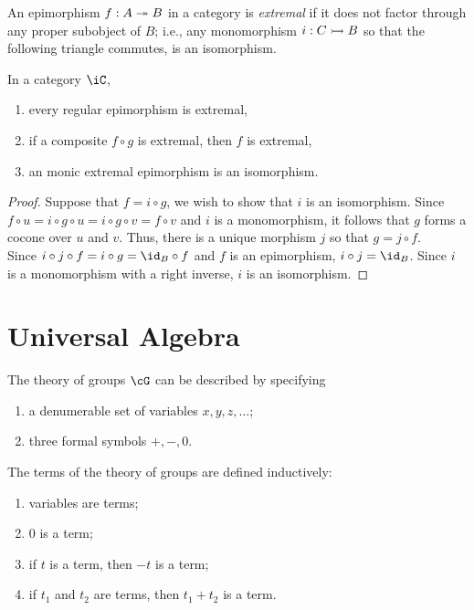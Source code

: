 \documentclass{amsart}
\begin{document}
\begin{defn}
  An epimorphism $f : A \twoheadrightarrow B$ in a category is \emph{extremal} if it does not factor through any proper subobject of $B$; i.e., any monomorphism $i : C \rightarrowtail B$ so that the following triangle commutes, is an isomorphism.
  \[\]
\end{defn}

\begin{prop}
  In a category $\iC$,
  \begin{enumerate}
  \item every regular epimorphism is extremal,
  \item if a composite $f \circ g$ is extremal, then $f$ is extremal,
  \item an monic extremal epimorphism is an isomorphism.
  \end{enumerate}
\end{prop}
\begin{proof}
  Suppose that $f = i \circ g$, we wish to show that $i$ is an isomorphism.
  Since $f \circ u = i \circ g \circ u = i \circ g \circ v = f \circ v$ and $i$ is a monomorphism, it follows that $g$ forms a cocone over $u$ and $v$.
  Thus, there is a unique morphism $j$ so that $g = j \circ f$.
  \[\]
  Since $i \circ j \circ f = i \circ g = \id_{B} \circ f$ and $f$ is an epimorphism, $i \circ j = \id_{B}$.
  Since $i$ is a monomorphism with a right inverse, $i$ is an isomorphism.
\end{proof}

\section{Universal Algebra}
\label{sec:universal-algebra}

The theory of groups $\cG$ can be described by specifying
\begin{enumerate}
\item a denumerable set of variables $x, y, z, \ldots$;
\item three formal symbols $+, -, 0$.
\end{enumerate}

The terms of the theory of groups are defined inductively:
\begin{enumerate}
\item variables are terms;
\item $0$ is a term;
\item if $t$ is a term, then $-t$ is a term;
\item if $t_{1}$ and $t_{2}$ are terms, then $t_{1} + t_{2}$ is a term.
\end{enumerate}
\end{document}

